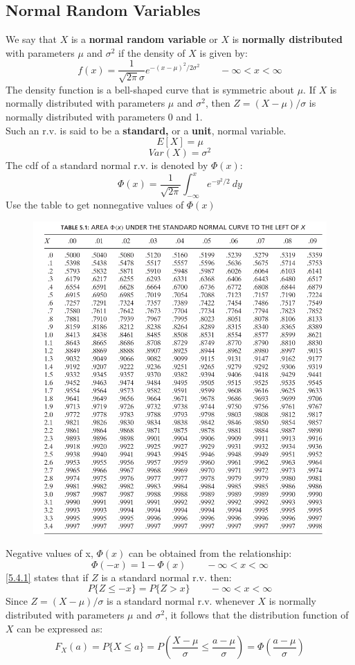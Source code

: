 \documentclass[openany]{book}
\numberwithin{equation}{section}
\begin{document}
\begin{flushleft}
\section{Normal Random Variables}
We say that $X$ is a \textbf{normal random variable} or $X$ is \textbf{normally distributed} with parameters $\mu$ and $\sigma^2$ if the density of $X$ is given by:
\[f(x)=\frac{1}{\sqrt{2\pi}\sigma}e^{-(x-\mu)^2/2\sigma^2} \qquad -\infty<x<\infty
\]
The density function is a bell-shaped curve that is symmetric about $\mu$. \medbreak
If $X$ is normally distributed with parameters $\mu$ and $\sigma^2$, then $Z=(X-\mu)/\sigma$ is normally distributed with parameters 0 and 1.\\
Such an r.v. is said to be a \textbf{standard,} or a \textbf{unit}, normal variable.\medbreak
\[E[X]= \mu
\]
\[Var(X)=\sigma^2
\]
The cdf of a standard normal r.v. is denoted by $\Phi(x)$:
\[\Phi(x)=\frac{1}{\sqrt{2\pi}}\int_{-\infty}^{x}e^{-y^2/2} \ dy
\]
\pagebreak
\medbreak
Use the table to get nonnegative values of $\Phi(x)$
\begin{figure}[H]
\includegraphics[scale=.8]{ncurve.png}
\end{figure}
Negative values of x, $\Phi(x)$ can be obtained from the relationship:
\begin{equation}
\label{5.4.1}
\Phi(-x)=1-\Phi(x) \qquad -\infty<x<\infty
\end{equation} 
\eqref{5.4.1} states that if $Z$ is a standard normal r.v. then:
\[P\{Z \leq -x\}=P\{Z>x\} \qquad -\infty<x<\infty
\]
Since $Z=(X-\mu)/\sigma$ is a standard normal r.v. whenever $X$ is normally distributed with parameters $\mu$ and $\sigma^2$, it follows that the distribution function of $X$ can be expressed as:
\[F_X(a)=P\{X\leq a \}=P \left(\frac{X-\mu}{\sigma}\leq \frac{a-\mu}{\sigma}\right)=\Phi \left(\frac{a-\mu}{\sigma}\right)
\]

\end{flushleft}
\end{document}
